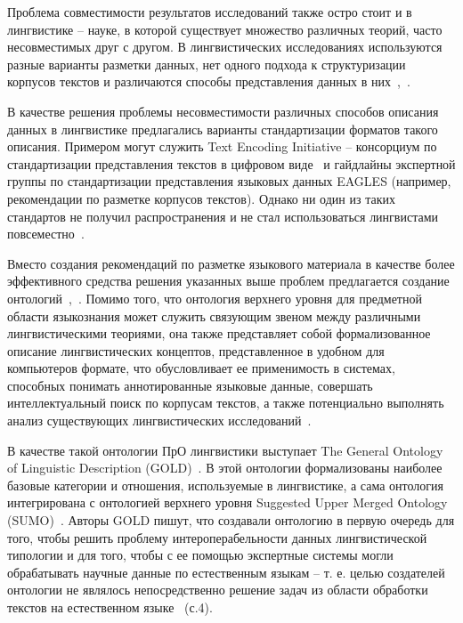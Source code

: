 Проблема совместимости результатов исследований также остро стоит и в лингвистике -- науке, в которой существует множество различных теорий, часто несовместимых друг с другом.
В лингвистических исследованиях используются разные варианты разметки данных, нет одного подхода к структуризации корпусов текстов и различаются способы представления данных в них~\cite{Farrar2002ACO},~\cite{Chiarcos2012}.

В качестве решения проблемы несовместимости различных способов описания данных в лингвистике предлагались варианты стандартизации форматов такого описания.
Примером могут служить Text Encoding Initiative -- консорциум по стандартизации представления текстов в цифровом виде~\cite{Text_Encoding_Initiative} и гайдлайны экспертной группы по стандартизации представления языковых данных EAGLES (например, рекомендации по разметке корпусов текстов\cite{EAGLES_Recommendations}).
Однако ни один из таких стандартов не получил распространения и не стал использоваться лингвистами повсеместно~\cite[p.~4]{Ide2010WhatDI}.

Вместо создания рекомендаций по разметке языкового материала в качестве более эффективного средства решения указанных выше проблем предлагается создание онтологий~\cite{schalley_2019},~\cite{mccrae_2015}.
Помимо того, что онтология верхнего уровня для предметной области языкознания может служить связующим звеном между различными лингвистическими теориями, она также представляет собой формализованное описание лингвистических концептов, представленное в удобном для компьютеров формате, что обусловливает ее применимость в системах, способных понимать аннотированные языковые данные, совершать интеллектуальный поиск по корпусам текстов, а также потенциально выполнять анализ существующих лингвистических исследований~\cite{Farrar2002ACO}.

В качестве такой онтологии ПрО лингвистики выступает The General Ontology of Linguistic Description (GOLD)~\cite{gold}.
В этой онтологии формализованы наиболее базовые категории и отношения, используемые в лингвистике, а сама онтология интегрирована с онтологией верхнего уровня Suggested Upper Merged Ontology (SUMO)~\cite{pease_2002_sumo}.
Авторы GOLD пишут, что создавали онтологию в первую очередь для того, чтобы решить проблему интероперабельности данных лингвистической типологии и для того, чтобы с ее помощью экспертные системы могли обрабатывать научные данные по естественным языкам -- т. е. целью создателей онтологии не являлось непосредственно решение задач из области обработки текстов на естественном языке~\cite{farrar_2003} (с.4).

